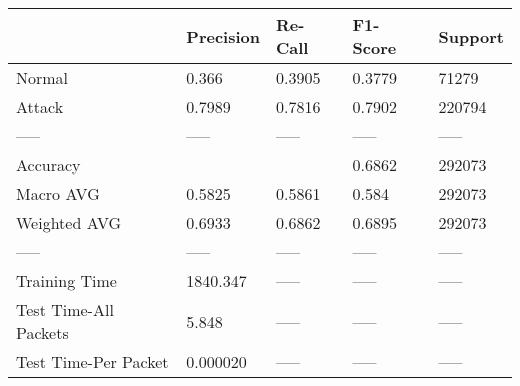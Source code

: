 \begin{tabular}{lllll}
\toprule
{} & Precision & Re-Call & F1-Score & Support \\
\midrule
Normal                &     0.366 &  0.3905 &   0.3779 &   71279 \\
Attack                &    0.7989 &  0.7816 &   0.7902 &  220794 \\
-----                 &     ----- &   ----- &    ----- &   ----- \\
Accuracy              &           &         &   0.6862 &  292073 \\
Macro AVG             &    0.5825 &  0.5861 &    0.584 &  292073 \\
Weighted AVG          &    0.6933 &  0.6862 &   0.6895 &  292073 \\
-----                 &     ----- &   ----- &    ----- &   ----- \\
Training Time         &  1840.347 &   ----- &    ----- &   ----- \\
Test Time-All Packets &     5.848 &   ----- &    ----- &   ----- \\
Test Time-Per Packet  &  0.000020 &   ----- &    ----- &   ----- \\
\bottomrule
\end{tabular}
